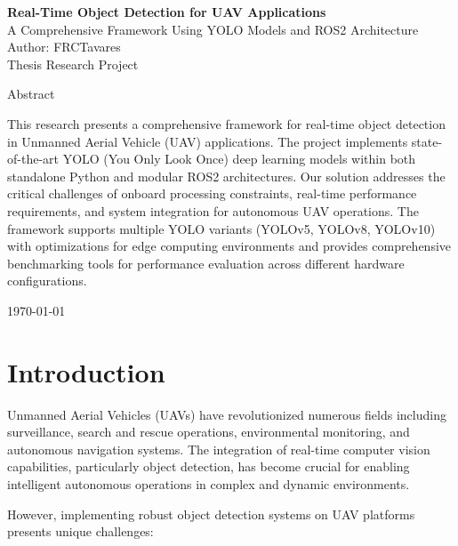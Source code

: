 \documentclass[12pt,a4paper]{article}
\begin{document}
\begin{titlepage}
    \centering
    \vspace*{2cm}
    
    {\huge\bfseries Real-Time Object Detection for UAV Applications}\\[0.5cm]
    {\LARGE A Comprehensive Framework Using YOLO Models and ROS2 Architecture}\\[2cm]
    
    {\Large Author: FRCTavares}\\[0.5cm]
    {\large Thesis Research Project}\\[1cm]
    
    \vspace{2cm}
    
    {\large Abstract}\\[0.5cm]
    \begin{minipage}{0.8\textwidth}
        \centering
        This research presents a comprehensive framework for real-time object detection in Unmanned Aerial Vehicle (UAV) applications. The project implements state-of-the-art YOLO (You Only Look Once) deep learning models within both standalone Python and modular ROS2 architectures. Our solution addresses the critical challenges of onboard processing constraints, real-time performance requirements, and system integration for autonomous UAV operations. The framework supports multiple YOLO variants (YOLOv5, YOLOv8, YOLOv10) with optimizations for edge computing environments and provides comprehensive benchmarking tools for performance evaluation across different hardware configurations.
    \end{minipage}
    
    \vfill
    {\large \today}
\end{titlepage}

\newpage
\tableofcontents
\newpage

\section{Introduction}

Unmanned Aerial Vehicles (UAVs) have revolutionized numerous fields including surveillance, search and rescue operations, environmental monitoring, and autonomous navigation systems. The integration of real-time computer vision capabilities, particularly object detection, has become crucial for enabling intelligent autonomous operations in complex and dynamic environments.

However, implementing robust object detection systems on UAV platforms presents unique challenges:
\end{document}
